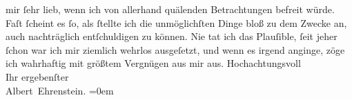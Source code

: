 \begin{ledgroupsized}[t]{13cm}
                    mir ſehr lieb, wenn ich von allerhand quälenden Betrachtungen befreit würde.
                    Faſt ſcheint es ſo, als ſtellte ich die unmöglichſten Dinge bloß zu dem Zwecke
                    an, auch nachträglich entſchuldigen zu können. Nie tat ich das Plauſible, ſeit
                    jeher ſchon war ich mir ziemlich wehrlos ausgeſetzt, und wenn es irgend anginge,
                    zöge ich {\pb}wahrhaftig mit größtem Vergnügen aus mir
                    aus.\pend
           \pstart
           Hochachtungsvoll{\\[\baselineskip]}Ihr ergebenſter{\\[\baselineskip]}\spacefill\mbox{Albert Ehrenstein.}\pend
           \leftskip=0em{}\endnumbering{}\end{ledgroupsized}  \newcommand{\dateiname}{L01840}\newcommand{\titel}{Albert Ehrenstein an Arthur Schnitzler, 6. 5. 1909}\newcommand{\editorInnen}{Martin Anton Müller und Gerd-Hermann Susen}
      
